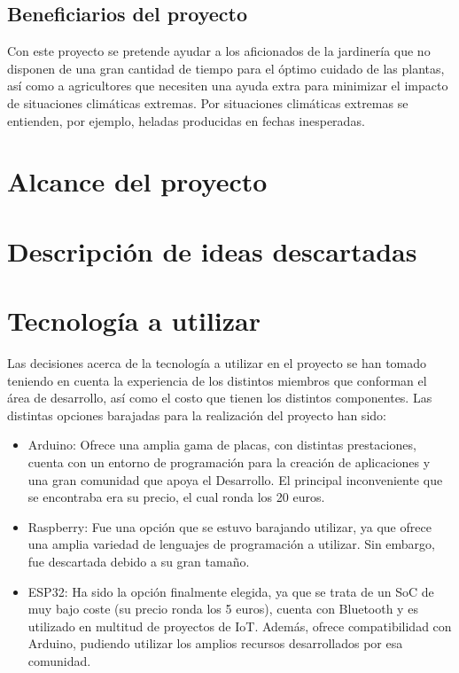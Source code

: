 \documentclass[runningheads]{llncs}
\begin{document}
    \subsection{Beneficiarios del proyecto}
    Con este proyecto se pretende ayudar a los aficionados de la jardinería que no disponen de una gran cantidad de tiempo para el óptimo cuidado de las plantas, así como a agricultores que necesiten una ayuda extra para minimizar el impacto de situaciones climáticas extremas. Por situaciones climáticas extremas se entienden, por ejemplo, heladas producidas en fechas inesperadas.
    
\section{Alcance del proyecto}

\section{Descripción de ideas descartadas}

\section{Tecnología a utilizar}
Las decisiones acerca de la tecnología a utilizar en el proyecto se han tomado teniendo en cuenta la experiencia de los distintos miembros que conforman el área de desarrollo, así como el costo que tienen los distintos componentes.
\newline
Las distintas opciones barajadas para la realización del proyecto han sido:

\begin{itemize}
    \item Arduino: Ofrece una amplia gama de placas, con distintas prestaciones, cuenta con un entorno de programación para la creación de aplicaciones y una gran comunidad que apoya el Desarrollo. El principal inconveniente que se encontraba era su precio, el cual ronda los 20 euros.
    
    \item Raspberry: Fue una opción que se estuvo barajando utilizar, ya que ofrece una amplia variedad de lenguajes de programación a utilizar. Sin embargo, fue descartada debido a su gran tamaño.
    
    \item ESP32: Ha sido la opción finalmente elegida, ya que se trata de un SoC de muy bajo coste (su precio ronda los 5 euros), cuenta con Bluetooth y es utilizado en multitud de proyectos de IoT. Además, ofrece compatibilidad con Arduino, pudiendo utilizar los amplios recursos desarrollados por esa comunidad.
\end{itemize}
\end{document}
